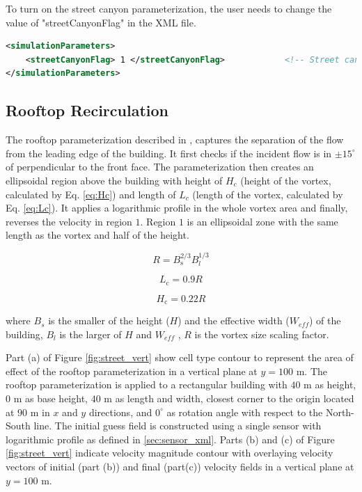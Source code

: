 To turn on the street canyon parameterization, the user needs to change the value of "streetCanyonFlag" in the XML file.

\begin{lstlisting}[language=XML]
<simulationParameters>
  	<streetCanyonFlag> 1 </streetCanyonFlag> 			<!-- Street canyon flag (0-none, 1-Roeckle w/ Fackrel (default)) -->
</simulationParameters>
\end{lstlisting}

\subsection{Rooftop Recirculation}

The rooftop parameterization described in \cite{bagal2004implementation,pol2006implementation}, captures the separation of the flow from the leading edge of the building. It first checks if the incident flow is in $\pm15^{\circ}$ of perpendicular to the front face. The parameterization then creates an ellipsoidal region above the building with height of $H_c$ (height of the vortex, calculated by Eq. \ref{eq:Hc}) and length of $L_c$ (length of the vortex, calculated by Eq. \ref{eq:Lc}). It applies a logarithmic profile in the whole vortex area and finally, reverses the velocity in region $1$. Region $1$ is an ellipsoidal zone with the same length as the vortex and half of the height.

\begin{equation}
R=B_{\mathrm{s}}^{2 / 3} B_{l}^{1 / 3}
\end{equation}

\begin{equation}
L_{\mathrm{c}}=0.9 R
\label{eq:Lc}
\end{equation}

\begin{equation}
H_{\mathrm{c}}=0.22 R
\label{eq:Hc}
\end{equation}

where $B_s$ is the smaller of the height ($H$) and the effective width ($W_{eff}$) of the
building, $B_l$ is the larger of $H$ and $W_{eff}$ , $R$ is the vortex size scaling factor.

Part (a) of Figure \ref{fig:street_vert} show cell type contour to represent the area of effect of the rooftop parameterization in a vertical plane at $y=100$ m. The rooftop parameterization is applied to a rectangular building with $40$ m as height, $0$ m as base height, $40$ m as length and width, closest corner to the origin located at $90$ m in $x$ and $y$ directions, and $0^{\circ}$ as rotation angle with respect to the North-South line. The initial guess field is constructed using a single sensor with logarithmic profile as defined in \ref{sec:sensor_xml}. Parts (b) and (c) of Figure \ref{fig:street_vert} indicate velocity magnitude contour with overlaying velocity vectors of initial (part (b)) and final (part(c)) velocity fields in a vertical plane at $y=100$ m.

